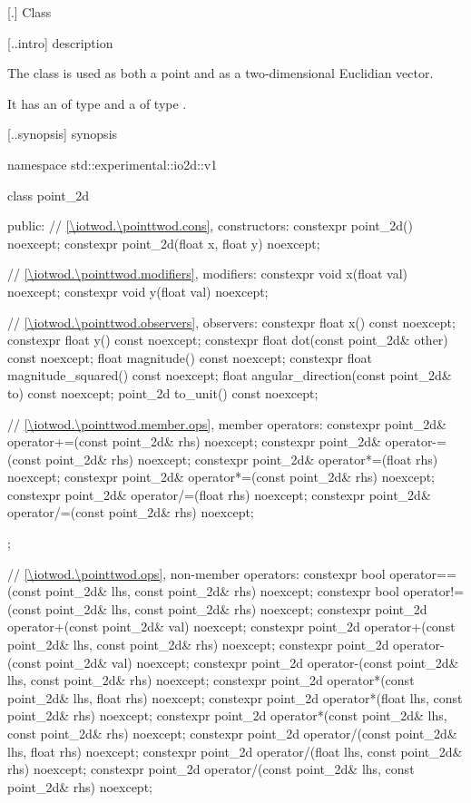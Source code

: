  [\iotwod.\pointtwod] {Class }

 [\iotwod.\pointtwod.intro] { description}

%
\pnum
The class  is used as both a point and as a two-dimensional Euclidian vector.

\pnum
It has an  of type  and a  of type .

 [\iotwod.\pointtwod.synopsis] { synopsis}

\begin{codeblock}
namespace std::experimental::io2d::v1 {
  class point_2d {
  public:
    // \ref{\iotwod.\pointtwod.cons}, constructors:
    constexpr point_2d() noexcept;
    constexpr point_2d(float x, float y) noexcept;

    // \ref{\iotwod.\pointtwod.modifiers}, modifiers:
    constexpr void x(float val) noexcept;
    constexpr void y(float val) noexcept;
    
    // \ref{\iotwod.\pointtwod.observers}, observers:
    constexpr float x() const noexcept;
    constexpr float y() const noexcept;
    constexpr float dot(const point_2d& other) const noexcept;
    float magnitude() const noexcept;
    constexpr float magnitude_squared() const noexcept;
    float angular_direction(const point_2d& to) const noexcept;
    point_2d to_unit() const noexcept;
    
    // \ref{\iotwod.\pointtwod.member.ops}, member operators:
    constexpr point_2d& operator+=(const point_2d& rhs) noexcept;
    constexpr point_2d& operator-=(const point_2d& rhs) noexcept;
    constexpr point_2d& operator*=(float rhs) noexcept;
    constexpr point_2d& operator*=(const point_2d& rhs) noexcept;
    constexpr point_2d& operator/=(float rhs) noexcept;
    constexpr point_2d& operator/=(const point_2d& rhs) noexcept;
  };
  
  // \ref{\iotwod.\pointtwod.ops}, non-member operators:
  constexpr bool operator==(const point_2d& lhs, const point_2d& rhs)
    noexcept;
  constexpr bool operator!=(const point_2d& lhs, const point_2d& rhs)
    noexcept;
  constexpr point_2d operator+(const point_2d& val) noexcept;
  constexpr point_2d operator+(const point_2d& lhs, const point_2d& rhs)
    noexcept;
  constexpr point_2d operator-(const point_2d& val) noexcept;
  constexpr point_2d operator-(const point_2d& lhs, const point_2d& rhs)
    noexcept;
  constexpr point_2d operator*(const point_2d& lhs, float rhs) noexcept;
  constexpr point_2d operator*(float lhs, const point_2d& rhs) noexcept;
  constexpr point_2d operator*(const point_2d& lhs, const point_2d& rhs)
    noexcept;
  constexpr point_2d operator/(const point_2d& lhs, float rhs) noexcept;
  constexpr point_2d operator/(float lhs, const point_2d& rhs) noexcept;
  constexpr point_2d operator/(const point_2d& lhs, const point_2d& rhs)
    noexcept;
}
\end{codeblock}

